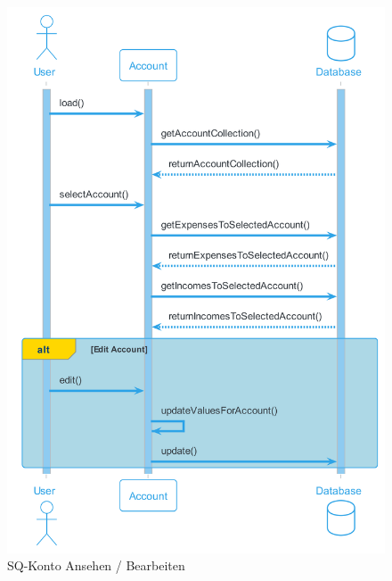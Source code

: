 \begin{figure}[H]
  \begin{center}
    \includegraphics[width=0.65\textheight]{content/diagrams/out/sequenzdiagram/kontoAnsehenBearbeiten/KontoAnsehenBearbeiten.png}
    \caption{SQ-Konto Ansehen / Bearbeiten}
  \end{center}
\end{figure}

